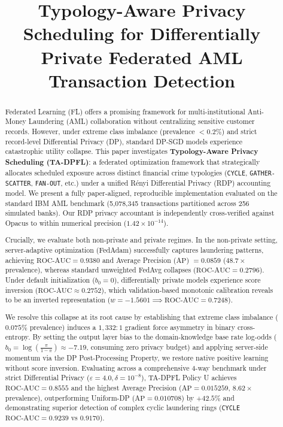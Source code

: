 \documentclass[conference]{IEEEtran}
\begin{document}
\title{Typology-Aware Privacy Scheduling for Differentially Private Federated AML Transaction Detection}

\author{}

\maketitle

\begin{abstract}
Federated Learning (FL) offers a promising framework for multi-institutional Anti-Money Laundering (AML) collaboration without centralizing sensitive customer records. However, under extreme class imbalance (prevalence $< 0.2\%$) and strict record-level Differential Privacy (DP), standard DP-SGD models experience catastrophic utility collapse. This paper investigates \textbf{Typology-Aware Privacy Scheduling (TA-DPFL)}: a federated optimization framework that strategically allocates scheduled exposure across distinct financial crime typologies (\texttt{CYCLE}, \texttt{GATHER-SCATTER}, \texttt{FAN-OUT}, etc.) under a unified R\'enyi Differential Privacy (RDP) accounting model. We present a fully paper-aligned, reproducible implementation evaluated on the standard IBM AML benchmark (5,078,345 transactions partitioned across 256 simulated banks). Our RDP privacy accountant is independently cross-verified against Opacus to within numerical precision ($1.42 \times 10^{-14}$). 

Crucially, we evaluate both non-private and private regimes. In the non-private setting, server-adaptive optimization (FedAdam) successfully captures laundering patterns, achieving $\text{ROC-AUC} = 0.9380$ and Average Precision ($\text{AP}$) $= 0.0859$ ($48.7\times$ prevalence), whereas standard unweighted FedAvg collapses ($\text{ROC-AUC} = 0.2796$). Under default initialization ($b_0 = 0$), differentially private models experience score inversion ($\text{ROC-AUC} \approx 0.2752$), which validation-based monotonic calibration reveals to be an inverted representation ($w = -1.5601 \implies \text{ROC-AUC} = 0.7248$). 

We resolve this collapse at its root cause by establishing that extreme class imbalance ($0.075\%$ prevalence) induces a $1,332:1$ gradient force asymmetry in binary cross-entropy. By setting the output layer bias to the domain-knowledge base rate log-odds ($b_0 = \log(\frac{\pi}{1-\pi}) \approx -7.19$, consuming zero privacy budget) and applying server-side momentum via the DP Post-Processing Property, we restore native positive learning without score inversion. Evaluating across a comprehensive 4-way benchmark under strict Differential Privacy ($\varepsilon = 4.0, \delta = 10^{-8}$), TA-DPFL Policy U achieves $\text{ROC-AUC} = 0.8555$ and the highest Average Precision ($\text{AP} = 0.015259$, $8.62\times$ prevalence), outperforming Uniform-DP ($\text{AP} = 0.010708$) by $+42.5\%$ and demonstrating superior detection of complex cyclic laundering rings (\texttt{CYCLE} $\text{ROC-AUC} = 0.9239$ vs $0.9170$). 


\end{abstract}
\end{document}
